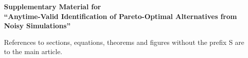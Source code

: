 \documentclass[12pt]{article}
\begin{document}
\begin{center}
{\Large\bf Supplementary Material for\\ ``Anytime-Valid Identification of Pareto-Optimal Alternatives from Noisy Simulations''}
\end{center}
\bigskip

References to sections, equations, theorems and figures without the prefix S are to the main article.







\end{document}
